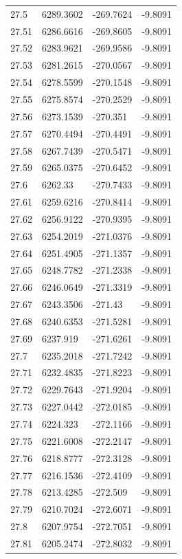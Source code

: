 \begin{table}[H]
\begin{tabular}{llll}
27.5 & 6289.3602 & -269.7624 & -9.8091 \\
27.51 & 6286.6616 & -269.8605 & -9.8091 \\
27.52 & 6283.9621 & -269.9586 & -9.8091 \\
27.53 & 6281.2615 & -270.0567 & -9.8091 \\
27.54 & 6278.5599 & -270.1548 & -9.8091 \\
27.55 & 6275.8574 & -270.2529 & -9.8091 \\
27.56 & 6273.1539 & -270.351 & -9.8091 \\
27.57 & 6270.4494 & -270.4491 & -9.8091 \\
27.58 & 6267.7439 & -270.5471 & -9.8091 \\
27.59 & 6265.0375 & -270.6452 & -9.8091 \\
27.6 & 6262.33 & -270.7433 & -9.8091 \\
27.61 & 6259.6216 & -270.8414 & -9.8091 \\
27.62 & 6256.9122 & -270.9395 & -9.8091 \\
27.63 & 6254.2019 & -271.0376 & -9.8091 \\
27.64 & 6251.4905 & -271.1357 & -9.8091 \\
27.65 & 6248.7782 & -271.2338 & -9.8091 \\
27.66 & 6246.0649 & -271.3319 & -9.8091 \\
27.67 & 6243.3506 & -271.43 & -9.8091 \\
27.68 & 6240.6353 & -271.5281 & -9.8091 \\
27.69 & 6237.919 & -271.6261 & -9.8091 \\
27.7 & 6235.2018 & -271.7242 & -9.8091 \\
27.71 & 6232.4835 & -271.8223 & -9.8091 \\
27.72 & 6229.7643 & -271.9204 & -9.8091 \\
27.73 & 6227.0442 & -272.0185 & -9.8091 \\
27.74 & 6224.323 & -272.1166 & -9.8091 \\
27.75 & 6221.6008 & -272.2147 & -9.8091 \\
27.76 & 6218.8777 & -272.3128 & -9.8091 \\
27.77 & 6216.1536 & -272.4109 & -9.8091 \\
27.78 & 6213.4285 & -272.509 & -9.8091 \\
27.79 & 6210.7024 & -272.6071 & -9.8091 \\
27.8 & 6207.9754 & -272.7051 & -9.8091 \\
27.81 & 6205.2474 & -272.8032 & -9.8091 \\

\end{tabular}
\end{table}
